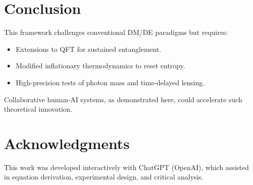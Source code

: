 \documentclass{article}
\begin{document}
\section{Conclusion}
This framework challenges conventional DM/DE paradigms but requires:
\begin{itemize}
\item Extensions to QFT for sustained entanglement.
\item Modified inflationary thermodynamics to reset entropy.
\item High-precision tests of photon mass and time-delayed lensing.
\end{itemize}
Collaborative human-AI systems, as demonstrated here, could accelerate such theoretical innovation.

\section*{Acknowledgments}
This work was developed interactively with ChatGPT (OpenAI), which assisted in equation derivation, experimental design, and critical analysis.



\end{document}

